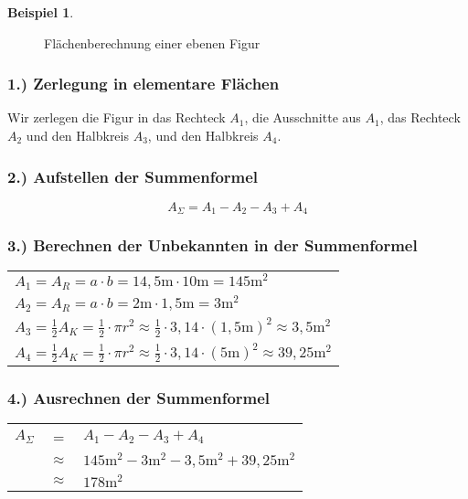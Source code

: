 \documentclass[a4paper]{book}%
\theoremstyle{definition}
\newtheorem{beispiel}{Beispiel}
\begin{document}
\begin{beispiel}
\begin{figure}
      \caption{Flächenberechnung einer ebenen Figur}\label{fig:BeispielEbeneFläche02}
    \end{figure}
    
    \subsubsection{1.) Zerlegung in elementare Flächen}
    
    Wir zerlegen die Figur in das Rechteck $A_1$, die Ausschnitte aus $A_1$, das Rechteck $A_2$ und den Halbkreis $A_3$, und den Halbkreis $A_4$.
    
    \subsubsection{2.) Aufstellen der Summenformel}
    
    \begin{equation*}
        A_\Sigma = A_1 - A_2 - A_3 + A_4
    \end{equation*}
    
    \subsubsection{3.) Berechnen der Unbekannten in der Summenformel}
    
    \begin{longtable}{l}
        $A_1 = A_R = a \cdot b = 14,5\text{m} \cdot 10\text{m} = 145\text{m}^2$\\
        $A_2 = A_R = a \cdot b = 2\text{m} \cdot 1,5\text{m} = 3\text{m}^2$\\
        $A_3 = \frac{1}{2} A_K = \frac{1}{2} \cdot \pi r^2 \approx \frac{1}{2} \cdot 3,14 \cdot (1,5\text{m})^2 \approx 3,5\text{m}^2$\\
        $A_4 = \frac{1}{2} A_K = \frac{1}{2} \cdot \pi r^2 \approx \frac{1}{2} \cdot 3,14 \cdot (5\text{m})^2 \approx 39,25\text{m}^2$
    \end{longtable}
    
    \subsubsection{4.) Ausrechnen der Summenformel}
    
    \begin{longtable}{lcl}
        $A_\Sigma$ & = & $A_1 - A_2 - A_3 + A_4$\\
        & $\approx$ & $145\text{m}^2 - 3\text{m}^2 - 3,5\text{m}^2 + 39,25\text{m}^2$\\
        & $\approx$ & $178 \text{m}^2$
    \end{longtable}
\end{beispiel}
\end{document}
